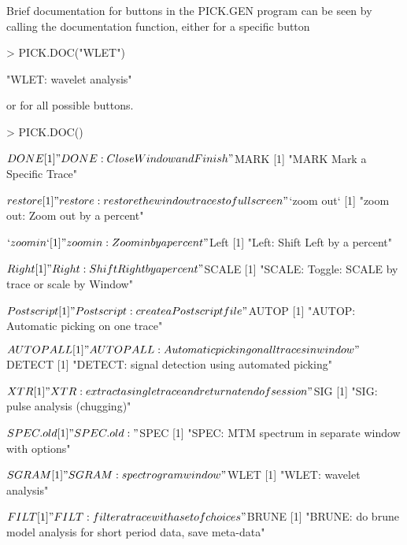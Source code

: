\documentclass{article}
\begin{document}
Brief documentation for buttons in the PICK.GEN
program can be seen by calling the documentation function,
either for a specific button 

\begin{Schunk}
\begin{Sinput}
> PICK.DOC("WLET")
\end{Sinput}
\begin{Soutput}
[1] "WLET: wavelet analysis"
\end{Soutput}
\end{Schunk}
or for 
all possible buttons.
\begin{Schunk}
\begin{Sinput}
> PICK.DOC()
\end{Sinput}
\begin{Soutput}
$DONE
[1] "DONE: Close Window and Finish"

$MARK
[1] "MARK Mark a Specific Trace"

$restore
[1] "restore: restore the window traces to full screen"

$`zoom out`
[1] "zoom out: Zoom out by a percent"

$`zoom in`
[1] "zoom in: Zoom in  by a percent"

$Left
[1] "Left: Shift Left by a percent"

$Right
[1] "Right: Shift Right by a percent"

$SCALE
[1] "SCALE: Toggle: SCALE by trace or scale by Window"

$Postscript
[1] "Postscript: create a Postscript file"

$AUTOP
[1] "AUTOP: Automatic picking on one trace"

$AUTOPALL
[1] "AUTOPALL: Automatic picking on all traces in window"

$DETECT
[1] "DETECT: signal detection using automated picking"

$XTR
[1] "XTR: extract a single trace and return at end of session"

$SIG
[1] "SIG: pulse analysis (chugging)"

$SPEC.old
[1] "SPEC.old: "

$SPEC
[1] "SPEC: MTM spectrum in separate window with options"

$SGRAM
[1] "SGRAM: spectrogram window"

$WLET
[1] "WLET: wavelet analysis"

$FILT
[1] "FILT: filter a trace with a set of choices"

$BRUNE
[1] "BRUNE: do brune model analysis for short period data, save meta-data"


\end{Soutput}
\end{Schunk}
\end{document}
